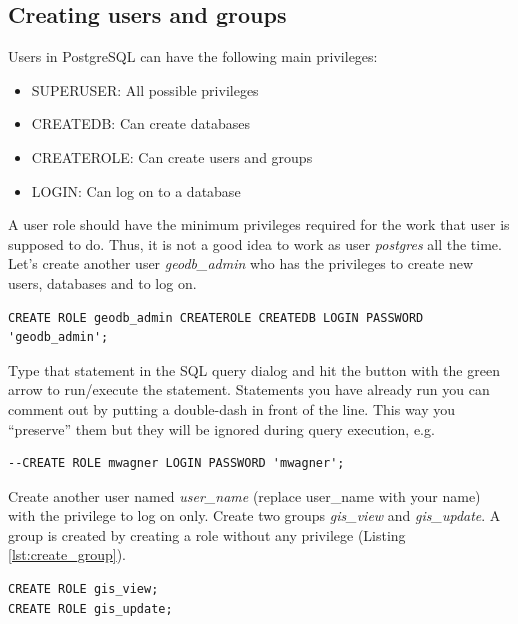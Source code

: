 \documentclass[a4paper,12pt,titlepage]{article}
\begin{document}
\subsection{Creating users and groups}

Users in PostgreSQL can have the following main privileges:

\begin{itemize}
	\item SUPERUSER: All possible privileges
	\item CREATEDB: Can create databases
	\item CREATEROLE: Can create users and groups
	\item LOGIN: Can log on to a database
\end{itemize}

A user role should have the minimum privileges required for the work that user is supposed to do. Thus, it is not a good idea to work as user \textit{postgres} all the time. Let's create another user \textit{geodb\_admin} who has the privileges to create new users, databases and to log on.

\begin{lstlisting}[caption={Creating a user},label=lst:create_user]
CREATE ROLE geodb_admin CREATEROLE CREATEDB LOGIN PASSWORD 'geodb_admin';
\end{lstlisting}

Type that statement in the SQL query dialog and hit the button with the green arrow to run/execute the statement. Statements you have already run you can comment out by putting a double-dash in front of the line. This way you ``preserve'' them but they will be ignored during query execution, e.g.

\begin{lstlisting}[caption={Commenting out an SQL statement},label=lst:comment]
--CREATE ROLE mwagner LOGIN PASSWORD 'mwagner';
\end{lstlisting}

Create another user named \textit{user\_name} (replace user\_name with your name) with the privilege to log on only. Create two groups \textit{gis\_view} and \textit{gis\_update}. A group is created by creating a role without any privilege (Listing \ref{lst:create_group}).

\begin{lstlisting}[caption={Creating groups},label=lst:create_group]
CREATE ROLE gis_view;
CREATE ROLE gis_update;
\end{lstlisting}
\end{document}
